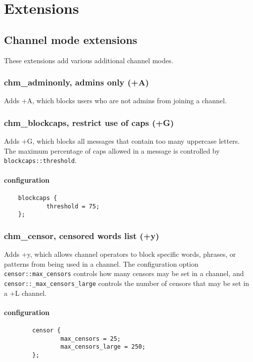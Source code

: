 \chapter{Extensions}
\label{extensions}

\section{Channel mode extensions}
\label{chmextensions}

	These extensions add various additional channel modes.

\subsection{chm\_adminonly, admins only (+A)}

	Adds +A, which blocks users who are not admins from joining a channel.

\subsection{chm\_blockcaps, restrict use of caps (+G)}

	Adds +G, which blocks all messages that contain too many uppercase
	letters.  The maximum percentage of caps allowed in a message is
	controlled by \nolinkurl{blockcaps::threshold}.
	\subsubsection{configuration}
	\begin{verbatim}
	blockcaps {
	        threshold = 75;
	};
	\end{verbatim}

\subsection{chm\_censor, censored words list (+y)}

	Adds +y, which allows channel operators to block specific words,
	phrases, or patterns from being used in a channel.  The configuration
	option \nolinkurl{censor::max\_censors} controls how many censors may
	be set in a channel, and \nolinkurl{censor::\_max\_censors\_large}
	controls the number of censors that may be set in a +L channel.
	\subsubsection{configuration}
		\begin{verbatim}
		censor {
		        max_censors = 25;
		        max_censors_large = 250;
		};
		\end{verbatim}

